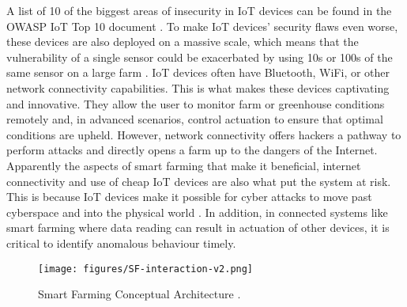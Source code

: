 A list of 10 of the biggest areas of insecurity in IoT devices can be found in the OWASP IoT Top 10 document \cite{owasp}. To make IoT devices' security flaws even worse, these devices are also deployed on a massive scale, which means that the vulnerability of a single sensor could be exacerbated by using 10s or 100s of the same sensor on a large farm \cite{tawalbeh2020iot}. IoT devices often have Bluetooth, WiFi, or other network connectivity capabilities. This is what makes these devices captivating and innovative. They allow the user to monitor farm or greenhouse conditions remotely and, in advanced scenarios, control actuation to ensure that optimal conditions are upheld. However, network connectivity offers hackers a pathway to perform attacks and directly opens a farm up to the dangers of the Internet. Apparently the aspects of smart farming that make it beneficial, internet connectivity and use of cheap IoT devices are also what put the system at risk. This is because IoT devices make it possible for cyber attacks to move past cyberspace and into the physical world \cite{fu2021hawatcher}. In addition, in connected systems like smart farming where data reading can result in actuation of other devices, it is critical to identify anomalous behaviour timely. 

\begin{figure}[t!]
    \centering
    \texttt{[image: figures/SF-interaction-v2.png]}
    \caption{Smart Farming Conceptual Architecture \cite{gupta2020security}.}
    \label{fig:smart_farming_interaction}
\end{figure}

